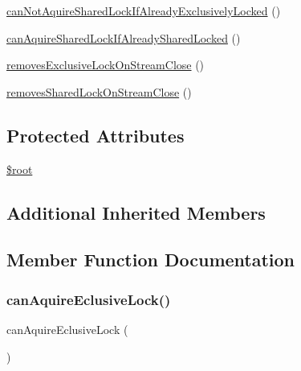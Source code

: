 \begin{DoxyCompactItemize}
\mbox{\hyperlink{classorg_1_1bovigo_1_1vfs_1_1vfs_stream_wrapper_flock_test_case_a569c92bf78e7f6f2976c725c385bb890}{can\+Not\+Aquire\+Shared\+Lock\+If\+Already\+Exclusively\+Locked}} ()
\item 
\mbox{\hyperlink{classorg_1_1bovigo_1_1vfs_1_1vfs_stream_wrapper_flock_test_case_a1ed3dd3170d6388f183204c13a51fe67}{can\+Aquire\+Shared\+Lock\+If\+Already\+Shared\+Locked}} ()
\item 
\mbox{\hyperlink{classorg_1_1bovigo_1_1vfs_1_1vfs_stream_wrapper_flock_test_case_a9c058b65baf543b7d23cd5177ccf2fee}{removes\+Exclusive\+Lock\+On\+Stream\+Close}} ()
\item 
\mbox{\hyperlink{classorg_1_1bovigo_1_1vfs_1_1vfs_stream_wrapper_flock_test_case_a47bd2a6ae21de9269b49037e528cee90}{removes\+Shared\+Lock\+On\+Stream\+Close}} ()
\end{DoxyCompactItemize}
\subsection*{Protected Attributes}
\begin{DoxyCompactItemize}
\item 
\mbox{\hyperlink{classorg_1_1bovigo_1_1vfs_1_1vfs_stream_wrapper_flock_test_case_ab37f7c32f41c3c61ed940887453767f4}{\$root}}
\end{DoxyCompactItemize}
\subsection*{Additional Inherited Members}


\subsection{Member Function Documentation}
\mbox{\label{classorg_1_1bovigo_1_1vfs_1_1vfs_stream_wrapper_flock_test_case_a3aadad883068df958e1fb0a5567f5551}} 
\subsubsection{\texorpdfstring{can\+Aquire\+Eclusive\+Lock()}{canAquireEclusiveLock()}}
{\footnotesize\ttfamily can\+Aquire\+Eclusive\+Lock (\begin{DoxyParamCaption}{ }\end{DoxyParamCaption})}

